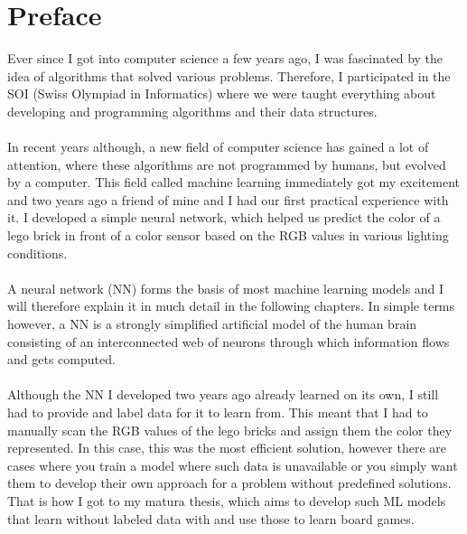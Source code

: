 \documentclass[11pt]{report}
\begin{document}
    \section{Preface}\label{sec:preface}
    Ever since I got into computer science a few years ago, I was fascinated by the idea of algorithms that solved various problems.
    Therefore, I participated in the SOI (Swiss Olympiad in Informatics) where we were taught everything about developing and programming algorithms and their data structures.
    \\ \\
    In recent years although, a new field of computer science has gained a lot of attention, where these algorithms are not programmed by humans, but evolved by a computer.
    This field called machine learning immediately got my excitement and two years ago a friend of mine and I had our first practical experience with it.
    I developed a simple neural network, which helped us predict the color of a lego brick in front of a color sensor based on the RGB values in various lighting conditions.
    \\ \\
    A neural network (NN) forms the basis of most machine learning models and I will therefore explain it in much detail in the following chapters.
    In simple terms however, a NN is a strongly simplified artificial model of the human brain consisting of an interconnected web of neurons through which information flows and gets computed.
    \\ \\
    Although the NN I developed two years ago already learned on its own, I still had to provide and label data for it to learn from.
    This meant that I had to manually scan the RGB values of the lego bricks and assign them the color they represented.
    In this case, this was the most efficient solution, however there are cases where you train a model where such data is unavailable or you simply want them to develop their own approach for a problem without predefined solutions.
    That is how I got to my matura thesis, which aims to develop such ML models that learn without labeled data with and use those to learn board games.
\end{document}
